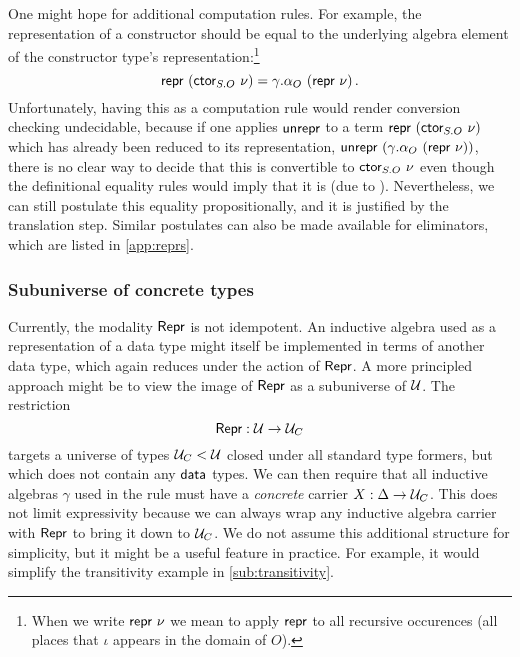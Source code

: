 One might hope for additional computation rules. For example, the representation of a constructor
should be equal to the underlying algebra element of the constructor type's
representation:\footnote{When we write $\Mrepr\ \nu$ we
mean to apply $\textsf{repr}$ to all recursive occurences (all places that $\iota$ appears in the domain of $O$).}
\[\textsf{repr}\ (\textsf{ctor}_{S.O}\ \nu) = \gamma.\alpha_O\ (\textsf{repr} \  \nu) \,.\]
Unfortunately, having this as a computation rule
would render conversion checking undecidable, because if one applies
$\textsf{unrepr}$ to a term $\textsf{repr}\ (\textsf{ctor}_{S.O}\ \nu)$ which has already been reduced
to its representation, $\mta{unrepr}\ (\gamma.\alpha_O\ (\Mrepr\ \nu))$, there is no
clear way to decide that this is convertible to $\textsf{ctor}_{S.O}\ \nu$ even though the
definitional equality rules would imply that it is (due to ).
Nevertheless, we can still postulate this equality propositionally, and it is justified
by the translation step. Similar postulates can also be made available for
eliminators, which are listed in \cref{app:reprs}.

\subsubsection{Subuniverse of concrete types}

Currently, the modality $\textsf{Repr}$ is not idempotent. An inductive algebra used
as a representation of a data type might itself be implemented in terms of another
data type, which again reduces under the action of $\textsf{Repr}$. A more principled approach
might be to view the image of $\textsf{Repr}$ as a subuniverse of $\mathcal{U}$. The restriction
$$
\textsf{Repr} : \mathcal{U} \to \mathcal{U}_C
$$
targets a universe of types $\mathcal{U}_C < \mathcal{U}$ closed under all standard type
formers, but which does not contain any $\textsf{data}$ types. We can then require that
all inductive algebras $\gamma$ used in the rule  must have a
\emph{concrete} carrier $X : \Delta \to \mathcal{U}_C$. This does not limit
expressivity because we can always wrap any inductive algebra carrier with
$\textsf{Repr}$ to bring it down to $\mathcal{U}_C$. We do not assume this additional
structure for simplicity, but it might be a useful feature in practice. For example,
it would simplify the transitivity example in \cref{sub:transitivity}.

